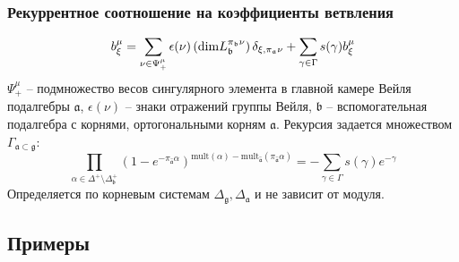 \documentclass[pdftex]{beamer}
\newcommand{\gf}{\mathfrak{g}}
\newcommand{\gfh}{\hat{\mathfrak{g}}}
\newcommand{\af}{\mathfrak{a}}
\newcommand{\afh}{\hat{\mathfrak{a}}}
\newcommand{\bff}{\mathfrak{b}}
\theoremstyle{definition} \newtheorem{Def}{Определение}
\begin{document}
\begin{frame}
  \frametitle{Рекуррентное соотношение на коэффициенты ветвления}
  \begin{equation*}
    b_{\xi }^{ \mu } =  \sum_{\nu\in \Psi^{\mu}_{+}} \epsilon (\nu)\left(\mathrm{dim}L_{\mathfrak{b}}^{\pi_{ \frak{b} }\nu }\right)
  \delta_{\xi,\pi_{\af}\nu}+\sum_{\gamma\in \Gamma}s(\gamma) b^{\mu}_{\xi}
\end{equation*}
 $\Psi^{\mu}_{+}$ -- подмножество весов сингулярного элемента в главной камере Вейля подалгебры $\af$, $\epsilon(\nu)$ -- знаки отражений группы Вейля, $\bff$ -- вспомогательная подалгебра с корнями, ортогональными корням $\af$.
Рекурсия задается множеством $\Gamma _{\af\subset \gf}$:
\begin{equation*}
\prod_{\alpha \in \Delta ^{+}\setminus \Delta _{\mathfrak{b} }^{+}}\left( 1-e^{-\pi
_{\afh}\alpha }\right) ^{\mathrm{mult}(\alpha )-\mathrm{mult}_{\afh}(\pi _{\afh}\alpha )}=-\sum_{\gamma \in \Gamma}s(\gamma )e^{-\gamma }
\end{equation*}
Определяется по корневым системам $\Delta_{\gf}, \Delta_{\af}$ и не зависит от модуля.
\end{frame}
\subsection{Примеры}
\end{document}
